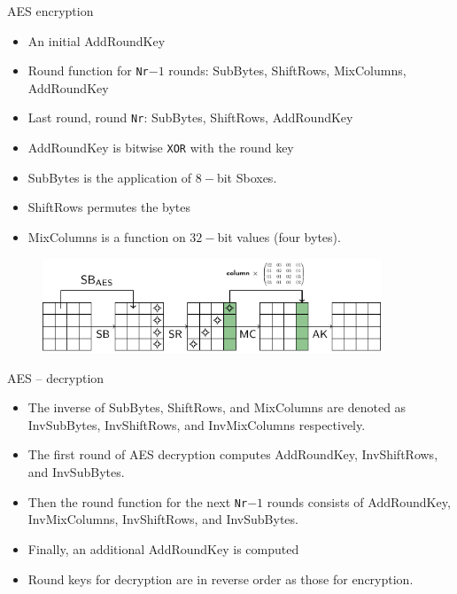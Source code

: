 \begin{frame}{AES encryption}
    \begin{itemize}
            \item An initial AddRoundKey
            \item Round function for \texttt{Nr}$-1$ rounds: SubBytes, ShiftRows, MixColumns, AddRoundKey
            \item Last round, round \texttt{Nr}: SubBytes, ShiftRows, AddRoundKey 
            \item AddRoundKey is bitwise \texttt{XOR} with the round key 
            \item SubBytes is the application of $8-$bit Sboxes.
             \item ShiftRows permutes the bytes 
             \item MixColumns is a function on $32-$bit values (four bytes).
        \end{itemize}
        \begin{figure}
        \centering
        \includegraphics[width=0.9\textwidth]{fig/AES_round_function.pdf}
    \end{figure}
\end{frame}

\begin{frame}{AES -- decryption}
    \begin{itemize}
        \item The inverse of SubBytes, ShiftRows, and MixColumns are denoted as InvSubBytes, InvShiftRows, and InvMixColumns respectively.
        \item The first round of AES decryption computes AddRoundKey, InvShiftRows, and InvSubBytes.
        \item Then the round function for the next \texttt{Nr}$-1$ rounds consists of AddRoundKey, InvMixColumns, InvShiftRows, and InvSubBytes.
        \item Finally, an additional AddRoundKey is computed
        \item Round keys for decryption are in reverse order as those for encryption.
    \end{itemize}
\end{frame}

